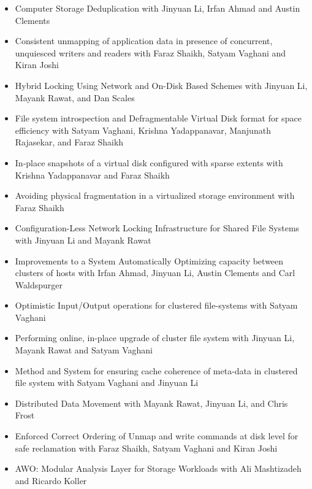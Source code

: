 \documentclass{article}
\begin{document}
  \begin{center}
  \begin{itemize}
  \item {Computer Storage Deduplication with Jinyuan Li, Irfan Ahmad and Austin Clements}
  \item {Consistent unmapping of application data in presence of concurrent,
        unquiesced writers and readers with Faraz Shaikh, Satyam Vaghani and
     Kiran Joshi}
  \item {Hybrid Locking Using Network and On-Disk Based Schemes with Jinyuan
         Li, Mayank Rawat, and Dan Scales}
  \item {File system introspection and Defragmentable Virtual Disk
        format for space efficiency with Satyam Vaghani, Krishna Yadappanavar, Manjunath Rajasekar,
        and Faraz Shaikh}
   \item {In-place snapshots of a virtual disk configured with sparse extents
      with Krishna Yadappanavar and Faraz Shaikh}
   \item {Avoiding physical fragmentation in a virtualized storage environment
      with Faraz Shaikh}
  \item {Configuration-Less Network Locking Infrastructure for Shared
        File Systems with Jinyuan Li and Mayank Rawat}
  \item {Improvements to a System Automatically Optimizing capacity
        between clusters of hosts with Irfan Ahmad, Jinyuan Li, Austin Clements and Carl Waldspurger}
  \item {Optimistic Input/Output operations for clustered file-systems with Satyam Vaghani}
  \item {Performing online, in-place upgrade of cluster file system with Jinyuan Li, Mayank Rawat and
        Satyam Vaghani}
  \item {Method and System for ensuring cache coherence of meta-data in clustered file system with Satyam Vaghani and Jinyuan Li}
  \item {Distributed Data Movement with Mayank Rawat, Jinyuan Li, and Chris Frost}
  \item {Enforced Correct Ordering of Unmap and write commands at disk level for safe reclamation with Faraz Shaikh, Satyam Vaghani and
         Kiran Joshi}
  \item {AWO: Modular Analysis Layer for Storage Workloads with Ali Mashtizadeh and Ricardo Koller}
  \end{itemize}
  \end{center}
\end{document}
